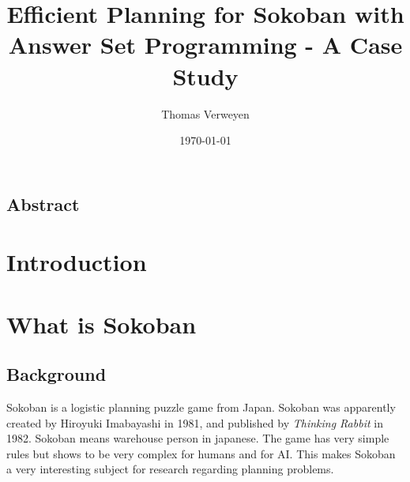 \documentclass{report}
\title{Efficient Planning for Sokoban with Answer Set Programming - A Case Study}
\author{Thomas Verweyen}
\date{\today}
\begin{document}
\maketitle
\renewcommand*\contentsname{Summary}
\tableofcontents
\section*{Abstract}
\chapter{Introduction}
\chapter{What is Sokoban}
\section{Background}
Sokoban is a logistic planning puzzle game from Japan. Sokoban was apparently created by Hiroyuki Imabayashi in 1981, and published by \textit{Thinking Rabbit} in 1982. Sokoban means warehouse person in japanese. The game has very simple rules but shows to be very complex for humans and for AI. This makes Sokoban a very interesting subject for research regarding planning problems.
\end{document}
